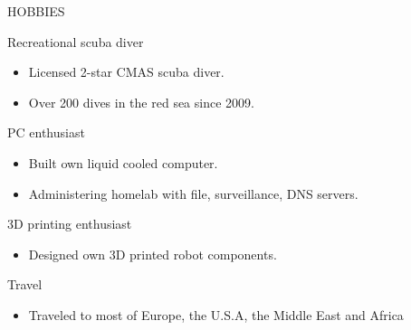 \documentclass{resume}
\begin{document}
\begin{minipage}[t]{0.49\textwidth}
	\begin{rsection}{\MakeUppercase{hobbies}}{}

		\begin{rcontent}{Recreational scuba diver}{}{}
			\begin{itemize}
				\item Licensed 2-star CMAS scuba diver.
				\item Over 200 dives in the red sea since 2009.
			\end{itemize}
		\end{rcontent}
		\divider
		\begin{rcontent}{PC enthusiast}{}{}
			\begin{itemize}
				\item Built own liquid cooled computer.
				\item Administering homelab with file, surveillance, DNS servers.
			\end{itemize}
		\end{rcontent}
		\divider
		\begin{rcontent}{3D printing enthusiast}{}{}
			\begin{itemize}
				\item Designed own 3D printed robot components.
			\end{itemize}
		\end{rcontent}
		\divider
		\begin{rcontent}{Travel}{}{}
			\begin{itemize}
				\item Traveled to most of Europe, the U.S.A, the Middle East and Africa
			\end{itemize}
		\end{rcontent}

	\end{rsection}

\end{minipage}
\hfill
\end{document}
